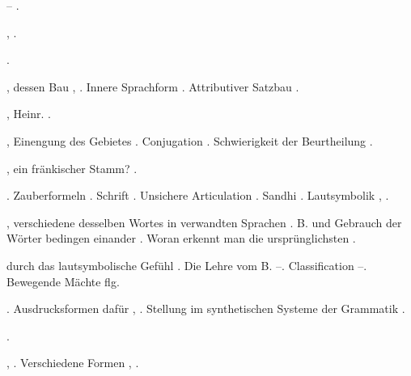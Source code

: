 \begin{register}
– \pageref{sp.122}.

 \pageref{sp.160}, \pageref{sp.282}.

 \pageref{sp.282}.

, dessen Bau \pageref{sp.149}, \pageref{sp.257}. Innere Sprachform \pageref{sp.151}. Attributiver Satzbau \pageref{sp.453}.

, Heinr. \pageref{sp.69}.


 \pageref{sp.54},  Einengung des Gebietes \pageref{sp.146}.  Conjugation \pageref{sp.423}. Schwierigkeit der Beurtheilung \pageref{sp.426}.

, ein fränkischer Stamm? \pageref{sp.159}. 

. Zauberformeln \pageref{sp.107}. Schrift \pageref{sp.131}. Unsichere Articulation \pageref{sp.193}. Sandhi \pageref{sp.199}. Lautsymbolik \pageref{sp.223}, \pageref{sp.379}.




, verschiedene desselben Wortes in verwandten Sprachen \pageref{sp.76}. B. und Gebrauch der Wörter bedingen einander \pageref{sp.125}. Woran erkennt man die ursprünglichsten \pageref{sp.157}.

 durch das lautsymbolische Gefühl \sed{\pageref{sp.214},} \pageref{sp.222}. Die Lehre vom B. \pageref{sp.227}–\pageref{sp.229}. Classification \pageref{sp.229}–\pageref{sp.231}. Bewegende Mächte \pageref{sp.231} flg.

. Ausdrucksformen dafür \pageref{sp.95}, \pageref{sp.98}. Stellung im synthetischen Systeme der Grammatik \pageref{sp.104}.


 \sed{\pageref{sp.240},} \pageref{sp.282}.

 \pageref{sp.103}, \pageref{sp.322}. Verschiedene Formen \pageref{sp.472}, \pageref{sp.473}.


\end{register}
